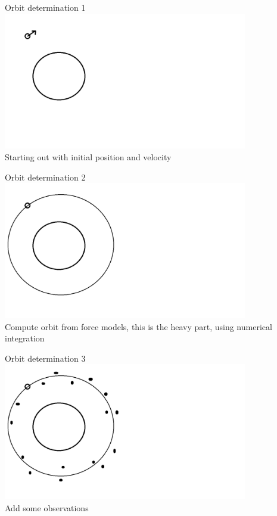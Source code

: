 \documentclass[12pt]{beamer}
\begin{document}
\begin{frame}{Orbit determination 1}
\includegraphics[width=0.8\textwidth]{figure/orbit1.png} \\ Starting out with initial position and velocity
\end{frame}


\begin{frame}{Orbit determination 2}
\includegraphics[width=0.8\textwidth]{figure/orbit2.png} \\ Compute orbit from force models, this is the heavy part, using numerical integration
\end{frame}


\begin{frame}{Orbit determination 3}
\includegraphics[width=0.8\textwidth]{figure/orbit3.png} \\ Add some observations
\end{frame}
\end{document}
